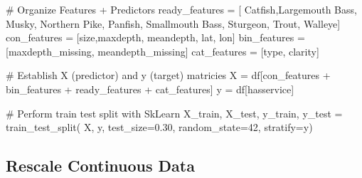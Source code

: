 \documentclass[
]{article}
\newenvironment{Shaded}{\begin{snugshade}}{\end{snugshade}}
\newcommand{\CommentTok}[1]{\textcolor[rgb]{0.37,0.37,0.37}{#1}}
\newcommand{\DecValTok}[1]{\textcolor[rgb]{0.68,0.00,0.00}{#1}}
\newcommand{\FloatTok}[1]{\textcolor[rgb]{0.68,0.00,0.00}{#1}}
\newcommand{\NormalTok}[1]{\textcolor[rgb]{0.00,0.23,0.31}{#1}}
\newcommand{\OperatorTok}[1]{\textcolor[rgb]{0.37,0.37,0.37}{#1}}
\newcommand{\StringTok}[1]{\textcolor[rgb]{0.13,0.47,0.30}{#1}}
\begin{document}
\begin{Shaded}
\begin{Highlighting}[]
\CommentTok{\# Organize Features + Predictors}
\NormalTok{ready\_features }\OperatorTok{=}\NormalTok{ [}
    \StringTok{\textquotesingle{}Catfish\textquotesingle{}}\NormalTok{,}\StringTok{\textquotesingle{}Largemouth Bass\textquotesingle{}}\NormalTok{, }\StringTok{\textquotesingle{}Musky\textquotesingle{}}\NormalTok{, }\StringTok{\textquotesingle{}Northern Pike\textquotesingle{}}\NormalTok{, }
    \StringTok{\textquotesingle{}Panfish\textquotesingle{}}\NormalTok{, }\StringTok{\textquotesingle{}Smallmouth Bass\textquotesingle{}}\NormalTok{, }\StringTok{\textquotesingle{}Sturgeon\textquotesingle{}}\NormalTok{, }\StringTok{\textquotesingle{}Trout\textquotesingle{}}\NormalTok{, }\StringTok{\textquotesingle{}Walleye\textquotesingle{}}\NormalTok{]}
\NormalTok{con\_features }\OperatorTok{=}\NormalTok{ [}\StringTok{\textquotesingle{}size\textquotesingle{}}\NormalTok{,}\StringTok{\textquotesingle{}maxdepth\textquotesingle{}}\NormalTok{, }\StringTok{\textquotesingle{}meandepth\textquotesingle{}}\NormalTok{, }\StringTok{\textquotesingle{}lat\textquotesingle{}}\NormalTok{, }\StringTok{\textquotesingle{}lon\textquotesingle{}}\NormalTok{]}
\NormalTok{bin\_features }\OperatorTok{=}\NormalTok{ [}\StringTok{\textquotesingle{}maxdepth\_missing\textquotesingle{}}\NormalTok{, }\StringTok{\textquotesingle{}meandepth\_missing\textquotesingle{}}\NormalTok{]}
\NormalTok{cat\_features }\OperatorTok{=}\NormalTok{ [}\StringTok{\textquotesingle{}type\textquotesingle{}}\NormalTok{, }\StringTok{\textquotesingle{}clarity\textquotesingle{}}\NormalTok{]}

\CommentTok{\# Establish X (predictor) and y (target) matricies}
\NormalTok{X }\OperatorTok{=}\NormalTok{ df[con\_features }\OperatorTok{+}\NormalTok{ bin\_features }\OperatorTok{+}\NormalTok{ ready\_features }\OperatorTok{+}\NormalTok{ cat\_features]}
\NormalTok{y }\OperatorTok{=}\NormalTok{ df[}\StringTok{\textquotesingle{}hasservice\textquotesingle{}}\NormalTok{]}

\CommentTok{\# Perform train test split with SkLearn}
\NormalTok{X\_train, X\_test, y\_train, y\_test }\OperatorTok{=}\NormalTok{ train\_test\_split(}
\NormalTok{    X, y, test\_size}\OperatorTok{=}\FloatTok{0.30}\NormalTok{, random\_state}\OperatorTok{=}\DecValTok{42}\NormalTok{, stratify}\OperatorTok{=}\NormalTok{y)}
\end{Highlighting}
\end{Shaded}

\subsection{Rescale Continuous Data}\label{rescale-continuous-data}
\end{document}
